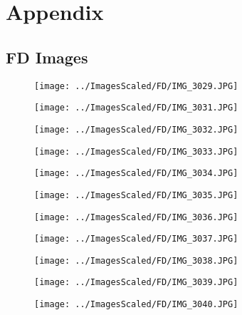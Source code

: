 \section{Appendix}

\subsection{FD Images}
\label{apx:fd}

\begin{figure}[H]
    \centering
    \texttt{[image: ../ImagesScaled/FD/IMG\_3029.JPG]}
\end{figure}
\begin{figure}[H]
    \centering
    \texttt{[image: ../ImagesScaled/FD/IMG\_3031.JPG]}
\end{figure}
\begin{figure}[H]
    \centering
    \texttt{[image: ../ImagesScaled/FD/IMG\_3032.JPG]}
\end{figure}
\begin{figure}[H]
    \centering
    \texttt{[image: ../ImagesScaled/FD/IMG\_3033.JPG]}
\end{figure}
\begin{figure}[H]
    \centering
    \texttt{[image: ../ImagesScaled/FD/IMG\_3034.JPG]}
\end{figure}
\begin{figure}[H]
    \centering
    \texttt{[image: ../ImagesScaled/FD/IMG\_3035.JPG]}
\end{figure}
\begin{figure}[H]
    \centering
    \texttt{[image: ../ImagesScaled/FD/IMG\_3036.JPG]}
\end{figure}
\begin{figure}[H]
    \centering
    \texttt{[image: ../ImagesScaled/FD/IMG\_3037.JPG]}
\end{figure}
\begin{figure}[H]
    \centering
    \texttt{[image: ../ImagesScaled/FD/IMG\_3038.JPG]}
\end{figure}
\begin{figure}[H]
    \centering
    \texttt{[image: ../ImagesScaled/FD/IMG\_3039.JPG]}
\end{figure}
\begin{figure}[H]
    \centering
    \texttt{[image: ../ImagesScaled/FD/IMG\_3040.JPG]}
\end{figure}
